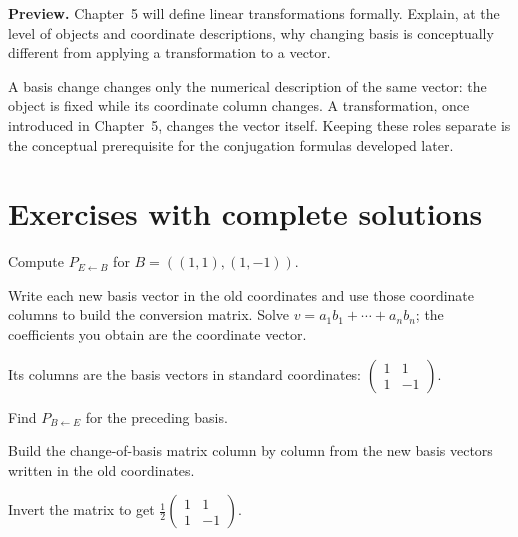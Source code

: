 \begin{problem}\label{prob:i04-problem-12}
\textbf{Preview.} Chapter~5 will define linear transformations formally. Explain, at the level of objects and coordinate descriptions, why changing basis is conceptually different from applying a transformation to a vector.
\end{problem}
\begin{solution}
A basis change changes only the numerical description of the same vector: the object is fixed while its coordinate column changes. A transformation, once introduced in Chapter~5, changes the vector itself. Keeping these roles separate is the conceptual prerequisite for the conjugation formulas developed later.
\end{solution}


\section{Exercises with complete solutions}

\begin{exercise}\label{exr:i04-01}
Compute $P_{E\leftarrow B}$ for $B=((1,1),(1,-1))$.
\end{exercise}
\begin{hint}
Write each new basis vector in the old coordinates and use those coordinate columns to build the conversion matrix. Solve \(v=a_1b_1+\cdots+a_nb_n\); the coefficients you obtain are the coordinate vector.
\end{hint}
\begin{solution}
Its columns are the basis vectors in standard coordinates: $\begin{pmatrix}1&1\\1&-1\end{pmatrix}$.
\end{solution}

\begin{exercise}\label{exr:i04-02}
Find $P_{B\leftarrow E}$ for the preceding basis.
\end{exercise}
\begin{hint}
Build the change-of-basis matrix column by column from the new basis vectors written in the old coordinates.
\end{hint}
\begin{solution}
Invert the matrix to get $\frac12\begin{pmatrix}1&1\\1&-1\end{pmatrix}$.
\end{solution}

